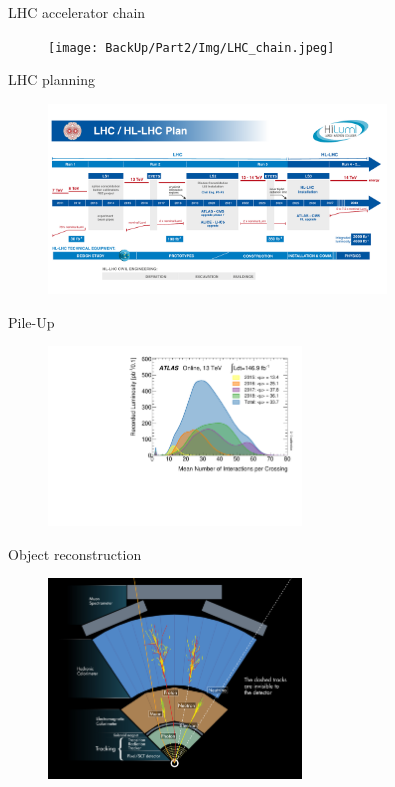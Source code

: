 \begin{frame}{LHC accelerator chain}
    \begin{figure}
        \centering
        \texttt{[image: BackUp/Part2/Img/LHC\_chain.jpeg]}
    \end{figure}
\end{frame}    
\begin{frame}{LHC planning}
    \begin{figure}
        \centering
        \includegraphics[width=0.8\textwidth]{BackUp/Part2/Img/HL-LHC-plan-2021-1.pdf}
    \end{figure}
\end{frame}
\begin{frame}{Pile-Up}
    \begin{figure}
        \centering
        \includegraphics[width=0.6\textwidth]{Part2/Img/mu_2015_2018.pdf}
    \end{figure}
\end{frame}
\begin{frame}{Object reconstruction}
    \begin{figure}
        \centering
        \includegraphics[width=0.6\textwidth]{Part2/Img/Particle_detection.jpg}
    \end{figure}
\end{frame}

